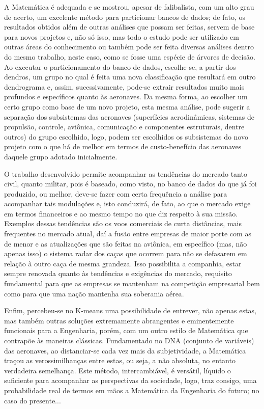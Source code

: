 \documentclass[12pt]{article} %
\begin{document}
	A Matemática é adequada e se mostrou, apesar de falibalista, com um alto grau de acerto, um excelente método para particionar bancos de dados; de fato, os resultados obtidos além de outras análises que possam ser feitas, servem de base para novos projetos e, não só isso, mas todo o estudo pode ser utilizado em outras áreas do conhecimento ou também pode ser feita diversas análises dentro do mesmo trabalho, neste caso, como se fosse uma espécie de árvores de decisão. Ao executar o particionamento do banco de dados, escolhe-se, a partir dos dendros, um grupo no qual é feita uma nova classificação que resultará em outro dendrograma e, assim, sucessivamente, pode-se extrair resultados muito mais profundos e específicos quanto às aeronaves. Da mesma forma, ao escolher um certo grupo como base de um novo projeto, esta mesma análise, pode sugerir a separação dos subsistemas  das aeronaves (superfícies aerodinâmicas, sistemas de propulsão, controle, aviônica, comunicação e componentes estruturais, dentre outros) do grupo escolhido, logo, podem ser escolhidos os subsistemas do novo projeto com o que há de melhor em termos de custo-benefício das aeronaves daquele grupo adotado inicialmente.
	
	O trabalho desenvolvido permite acompanhar as tendências do mercado tanto civil, quanto militar, pois é baseado, como visto, no banco de dados do que já foi produzido, ou melhor, deve-se fazer com certa frequência a análise para acompanhar tais modulações e, isto conduzirá, de fato, ao que o mercado exige em termos financeiros e ao mesmo tempo no que diz respeito à sua missão. Exemplos dessas tendências são os voos comerciais de curta distâncias, mais frequentes no mercado atual, daí a fusão entre empresas de maior porte com as de menor e as atualizações que são feitas na aviônica, em específico (mas, não apenas isso) o sistema radar dos caças que ocorrem para não se defasarem em relação à outro caça de mesma grandeza. Isso possibilita a companhia, estar sempre renovada quanto às tendências e exigências do mercado, requisito fundamental para que as empresas se mantenham na competição empresarial bem como para que uma nação mantenha sua soberania aérea. 
	
	Enfim, percebeu-se no K-means uma possibilidade de entrever, não apenas estas, mas também outras soluções extremamente abrangentes e eminentemente funcionais para a Engenharia, porém, com um outro estilo de Matemática que contrapõe às maneiras clássicas. Fundamentado no DNA (conjunto de variáveis) das aeronaves, ao distanciar-se cada vez mais da subjetividade, a Matemática traçou as verossimilhanças entre estas, ou seja, a não absoluta, no entanto verdadeira semelhança. Este método, intercambiável, é versátil, líquido o suficiente para acompanhar as perspectivas da sociedade, logo, traz consigo, uma probabilidade real de termos em mãos a Matemática da Engenharia do futuro; no caso do presente...
		
\end{document}
